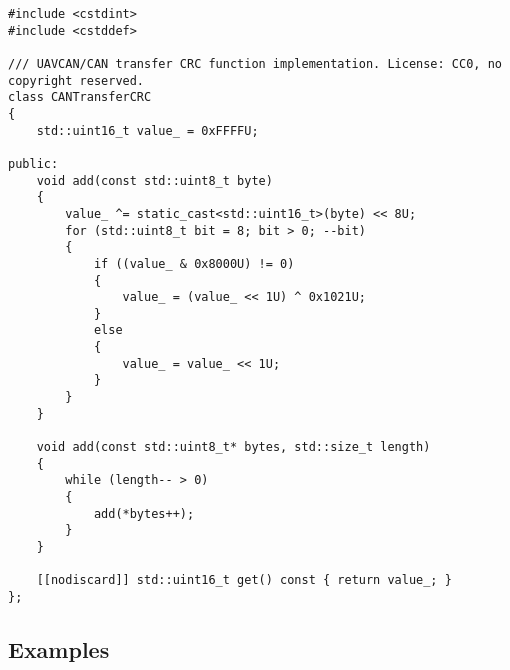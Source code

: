 \begin{samepage}
\begin{verbatim}
#include <cstdint>
#include <cstddef>

/// UAVCAN/CAN transfer CRC function implementation. License: CC0, no copyright reserved.
class CANTransferCRC
{
    std::uint16_t value_ = 0xFFFFU;

public:
    void add(const std::uint8_t byte)
    {
        value_ ^= static_cast<std::uint16_t>(byte) << 8U;
        for (std::uint8_t bit = 8; bit > 0; --bit)
        {
            if ((value_ & 0x8000U) != 0)
            {
                value_ = (value_ << 1U) ^ 0x1021U;
            }
            else
            {
                value_ = value_ << 1U;
            }
        }
    }

    void add(const std::uint8_t* bytes, std::size_t length)
    {
        while (length-- > 0)
        {
            add(*bytes++);
        }
    }

    [[nodiscard]] std::uint16_t get() const { return value_; }
};
\end{verbatim}
\end{samepage}

\subsection{Examples}

